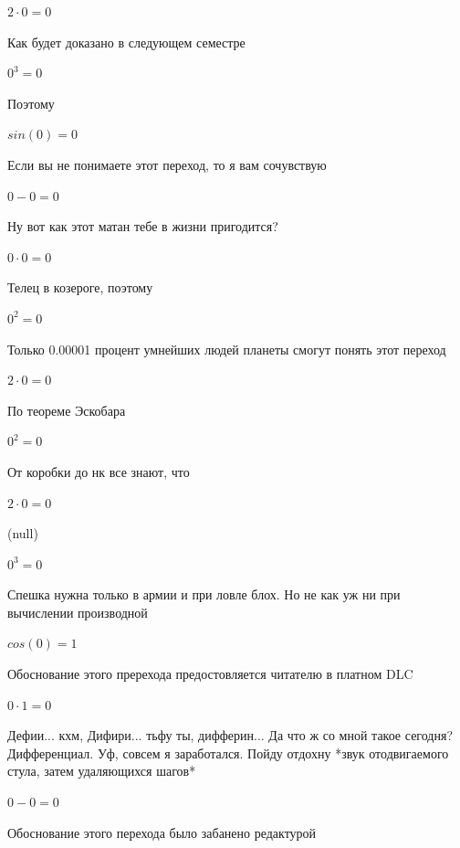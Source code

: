 \documentclass[12pt,a4paper,fleqn]{article}
\begin{document}
\begin{center}$2 \cdot 0 = 0$\end{center}
Как будет доказано в следующем семестре

\begin{center}$0^{3} = 0$\end{center}
Поэтому

\begin{center}$sin(0) = 0$\end{center}
Если вы не понимаете этот переход, то я вам сочувствую

\begin{center}$0-0 = 0$\end{center}
Ну вот как этот матан тебе в жизни пригодится?

\begin{center}$0 \cdot 0 = 0$\end{center}
Телец в козероге, поэтому

\begin{center}$0^{2} = 0$\end{center}
Только 0.00001 процент умнейших людей планеты смогут понять этот переход

\begin{center}$2 \cdot 0 = 0$\end{center}
По теореме Эскобара

\begin{center}$0^{2} = 0$\end{center}
От коробки до нк все знают, что

\begin{center}$2 \cdot 0 = 0$\end{center}
(null)\cite{link4}

\begin{center}$0^{3} = 0$\end{center}
Спешка нужна только в армии и при ловле блох. Но не как уж ни при вычислении производной\cite{link2}

\begin{center}$cos(0) = 1$\end{center}
Обоснование этого пререхода предостовляется читателю в платном DLC

\begin{center}$0 \cdot 1 = 0$\end{center}
Дефии... кхм, Дифири... тьфу ты, дифферин... Да что ж со мной такое сегодня? Дифференциал. Уф, совсем я заработался. Пойду отдохну *звук отодвигаемого стула, затем удаляющихся шагов*

\begin{center}$0-0 = 0$\end{center}
Обоснование этого перехода было забанено редактурой
\end{document}
